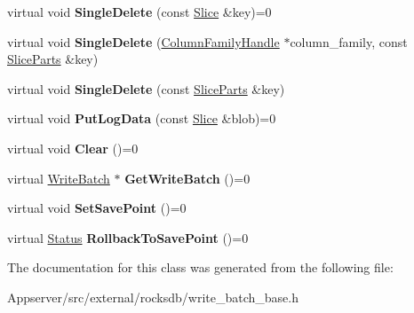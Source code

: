 \begin{DoxyCompactItemize}
\item 
virtual void {\bfseries Single\+Delete} (const \hyperlink{classrocksdb_1_1Slice}{Slice} \&key)=0\hypertarget{classrocksdb_1_1WriteBatchBase_a59a36aa86f45c0cec45fdeedf34c01a1}{}\label{classrocksdb_1_1WriteBatchBase_a59a36aa86f45c0cec45fdeedf34c01a1}

\item 
virtual void {\bfseries Single\+Delete} (\hyperlink{classrocksdb_1_1ColumnFamilyHandle}{Column\+Family\+Handle} $\ast$column\+\_\+family, const \hyperlink{structrocksdb_1_1SliceParts}{Slice\+Parts} \&key)\hypertarget{classrocksdb_1_1WriteBatchBase_a0b3acb31724227f0ff910a975fbe45e5}{}\label{classrocksdb_1_1WriteBatchBase_a0b3acb31724227f0ff910a975fbe45e5}

\item 
virtual void {\bfseries Single\+Delete} (const \hyperlink{structrocksdb_1_1SliceParts}{Slice\+Parts} \&key)\hypertarget{classrocksdb_1_1WriteBatchBase_a61e239f6b2a3f20f427a497fdb000010}{}\label{classrocksdb_1_1WriteBatchBase_a61e239f6b2a3f20f427a497fdb000010}

\item 
virtual void {\bfseries Put\+Log\+Data} (const \hyperlink{classrocksdb_1_1Slice}{Slice} \&blob)=0\hypertarget{classrocksdb_1_1WriteBatchBase_a96ec20fedbf4599aac6e928c32ab9cc6}{}\label{classrocksdb_1_1WriteBatchBase_a96ec20fedbf4599aac6e928c32ab9cc6}

\item 
virtual void {\bfseries Clear} ()=0\hypertarget{classrocksdb_1_1WriteBatchBase_aa4bcfcd049d8e9edd5f612ce3dd12e20}{}\label{classrocksdb_1_1WriteBatchBase_aa4bcfcd049d8e9edd5f612ce3dd12e20}

\item 
virtual \hyperlink{classrocksdb_1_1WriteBatch}{Write\+Batch} $\ast$ {\bfseries Get\+Write\+Batch} ()=0\hypertarget{classrocksdb_1_1WriteBatchBase_a88a0dda11442e45a2331807484c3141d}{}\label{classrocksdb_1_1WriteBatchBase_a88a0dda11442e45a2331807484c3141d}

\item 
virtual void {\bfseries Set\+Save\+Point} ()=0\hypertarget{classrocksdb_1_1WriteBatchBase_ac988faf4cc217b392f71457809a8a1ff}{}\label{classrocksdb_1_1WriteBatchBase_ac988faf4cc217b392f71457809a8a1ff}

\item 
virtual \hyperlink{classrocksdb_1_1Status}{Status} {\bfseries Rollback\+To\+Save\+Point} ()=0\hypertarget{classrocksdb_1_1WriteBatchBase_a523e2c60aa19a3b95072bb773ac3b13a}{}\label{classrocksdb_1_1WriteBatchBase_a523e2c60aa19a3b95072bb773ac3b13a}

\end{DoxyCompactItemize}


The documentation for this class was generated from the following file\+:\begin{DoxyCompactItemize}
\item 
Appserver/src/external/rocksdb/write\+\_\+batch\+\_\+base.\+h\end{DoxyCompactItemize}
